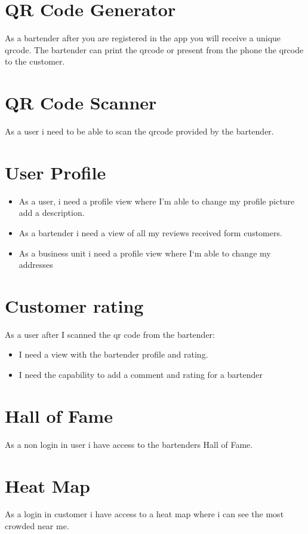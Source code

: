 \documentclass{scrreprt}
\begin{document}
\section{QR Code Generator}
As a bartender after you are registered in the app you will receive a unique qrcode.
The bartender can print the qrcode or present from the phone the qrcode to the customer.

\section{QR Code Scanner}
As a user i need to be able to scan the qrcode provided by the bartender.

\section{User Profile}
\begin{itemize}
    \item As a user, i need a profile view where I'm able to change my profile picture add a description.
    \item As a bartender i need a view of all my reviews received form customers.
    \item As a business unit i need a profile view where I`m able to change my addresses
\end{itemize}

\section{Customer rating}
As a user after I scanned the qr code from the bartender:
\begin{itemize}
    \item I need a view with the bartender profile and rating.
    \item I need the capability to add a comment and rating for a bartender
\end{itemize}

\section{Hall of Fame}
As a non login in user i have access to the bartenders Hall of Fame.

\section{Heat Map}
As a login in customer i have access to a heat map where i can see the most crowded near me.
\end{document}
